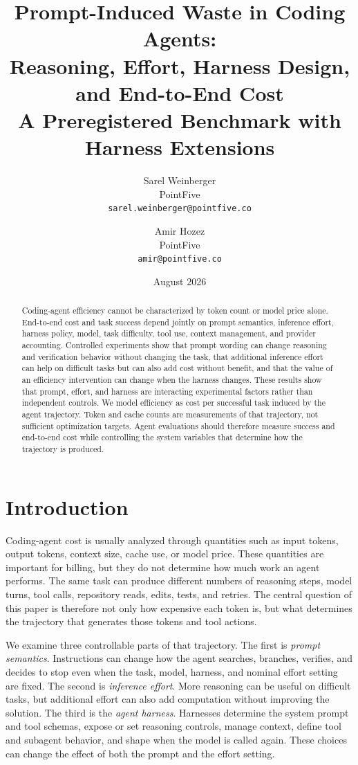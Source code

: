 \documentclass[11pt]{article}
\title{Prompt-Induced Waste in Coding Agents:\\
Reasoning, Effort, Harness Design, and End-to-End Cost\\
\large A Preregistered Benchmark with Harness Extensions}
\author{Sarel Weinberger\\
PointFive\\
\small\texttt{sarel.weinberger@pointfive.co}
\and
Amir Hozez\\
PointFive\\
\small\texttt{amir@pointfive.co}}
\date{August 2026}
\begin{document}
\maketitle

\begin{abstract}
Coding-agent efficiency cannot be characterized by token count or model price
alone. End-to-end cost and task success depend jointly on prompt semantics,
inference effort, harness policy, model, task difficulty, tool use, context
management, and provider accounting. Controlled experiments show that prompt
wording can change reasoning and verification behavior without changing the
task, that additional inference effort can help on difficult tasks but can also
add cost without benefit, and that the value of an efficiency intervention can
change when the harness changes. These results show that prompt, effort, and
harness are interacting experimental factors rather than independent controls.
We model efficiency as cost per successful task induced by the agent trajectory.
Token and cache counts are measurements of that trajectory, not sufficient
optimization targets. Agent evaluations should therefore measure success and
end-to-end cost while controlling the system variables that determine how the
trajectory is produced.
\end{abstract}
\section{Introduction}
Coding-agent cost is usually analyzed through quantities such as input tokens,
output tokens, context size, cache use, or model price. These quantities are
important for billing, but they do not determine how much work an agent performs.
The same task can produce different numbers of reasoning steps, model turns,
tool calls, repository reads, edits, tests, and retries. The central question of
this paper is therefore not only how expensive each token is, but what determines
the trajectory that generates those tokens and tool actions.

We examine three controllable parts of that trajectory. The first is
\emph{prompt semantics}. Instructions can change how the agent searches,
branches, verifies, and decides to stop even when the task, model, harness, and
nominal effort setting are fixed. The second is \emph{inference effort}. More
reasoning can be useful on difficult tasks, but additional effort can also add
computation without improving the solution. The third is the \emph{agent
harness}. Harnesses determine the system prompt and tool schemas, expose or set
reasoning controls, manage context, define tool and subagent behavior, and shape
when the model is called again. These choices can change the effect of both the
prompt and the effort setting.
\end{document}
